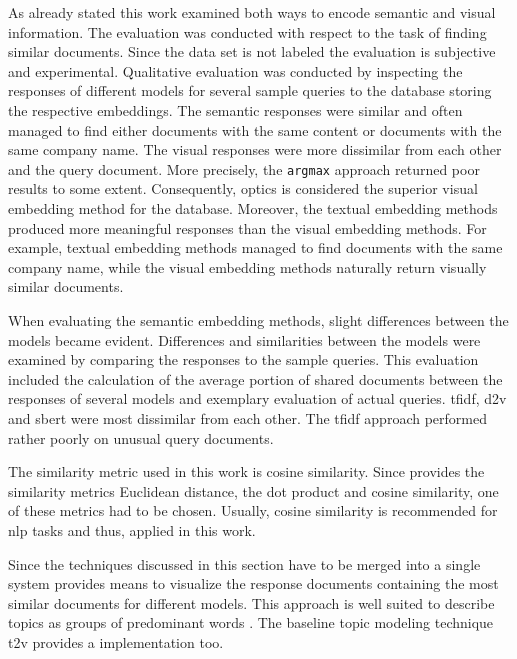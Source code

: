 As already stated this work examined both ways to encode semantic and visual information.
The evaluation was conducted with respect to the task of finding similar documents.
Since the data set is not labeled the evaluation is subjective and experimental.
Qualitative evaluation was conducted by inspecting the responses of different models for several sample queries to the database 
storing the respective embeddings.
The semantic responses were similar and often managed to find either documents with the same content or documents with the same company name.
The visual responses were more dissimilar from each other and the query document.
More precisely, the \texttt{argmax} approach returned poor results to some extent.
Consequently, \ac{optics} is considered the superior visual embedding method for the database.
Moreover, the textual embedding methods produced more meaningful responses than the visual embedding methods.
For example, textual embedding methods managed to find documents with the same company name, 
while the visual embedding methods naturally return visually similar documents.


When evaluating the semantic embedding methods, slight differences between the models became evident.
Differences and similarities between the models were examined by comparing the responses to the sample queries.
This evaluation included the calculation of the average portion of shared documents between the responses of several models 
and exemplary evaluation of actual queries.
\ac{tfidf}, \ac{d2v} and \ac{sbert} were most dissimilar from each other.
The \ac{tfidf} approach performed rather poorly on unusual query documents.


The similarity metric used in this work is cosine similarity.
Since \databaseName{} provides the similarity metrics Euclidean distance, the dot product and cosine similarity,
one of these metrics had to be chosen.
Usually, cosine similarity is recommended for \ac{nlp} tasks and thus, applied in this work.

Since the techniques discussed in this section have to be merged into a single system 
\wordcloud{} provides means to visualize the response documents containing the most similar documents for different models.
This approach is well suited to describe topics as groups of predominant words \cite{topic_modeling2019}.
The baseline topic modeling technique \ac{t2v} provides a \wordcloud{} implementation too.

